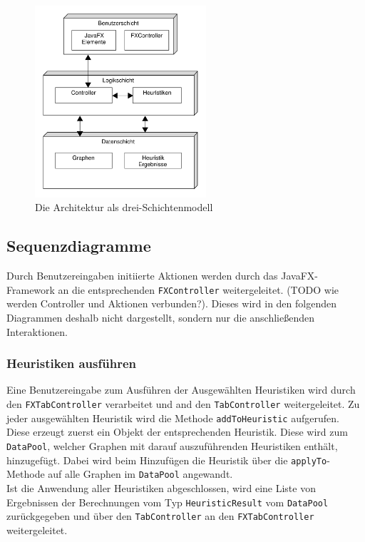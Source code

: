 	
	\begin{figure}
	\centering
\includegraphics[height=2.8in]{abbildungen/struktur3.pdf}

	\caption{Die Architektur als drei-Schichtenmodell }
	\label{img:struktur}
\end{figure}

\subsection{Sequenzdiagramme}
Durch Benutzereingaben initiierte Aktionen werden durch das JavaFX-Framework an die entsprechenden \texttt{FXController} weitergeleitet. (TODO wie werden Controller und Aktionen verbunden?). Dieses wird in den folgenden Diagrammen deshalb nicht dargestellt, sondern nur die anschließenden Interaktionen.
\subsubsection{Heuristiken ausführen}
	Eine Benutzereingabe zum Ausführen der Ausgewählten Heuristiken wird durch den \texttt{FXTabController} verarbeitet und and den \texttt{TabController} weitergeleitet. Zu jeder ausgewählten Heuristik wird die Methode \mbox{\texttt{addToHeuristic}} aufgerufen. Diese erzeugt zuerst ein Objekt der entsprechenden Heuristik. Diese wird zum \texttt{DataPool}, welcher Graphen mit darauf auszuführenden Heuristiken enthält, hinzugefügt. Dabei wird beim Hinzufügen die Heuristik über die \texttt{applyTo}-Methode auf alle Graphen im \texttt{DataPool} angewandt.\\
	Ist die Anwendung aller Heuristiken abgeschlossen, wird eine Liste von Ergebnissen der Berechnungen vom Typ \texttt{HeuristicResult} vom \texttt{DataPool} zurückgegeben und über den \texttt{TabController} an den \texttt{FXTabController} weitergeleitet.
	
